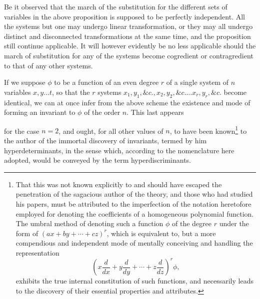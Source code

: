 \documentclass[11pt]{article}
\newcommand{\sourcepage}[1]{\marginpar{\scriptsize p.~#1}}
\begin{document}
Be it observed that the march of the substitution for the different sets of variables in the above proposition is supposed to be perfectly independent. All the systems but one may undergo linear transformation, or they may all undergo distinct and disconnected transformations at the same time, and the proposition still continue applicable. It will however evidently be no less applicable should the march of substitution for any of the systems become cogredient or contragredient to that of any other systems.

If we suppose $\phi$ to be a function of an even degree $r$ of a single system of $n$ variables $x,y\ldots t$, so that the $r$ systems $x_1,y_1,\&c., x_2,y_2,\&c.\ldots x_r,y_r,\&c.$ become identical, we can at once infer from the above scheme the existence and mode of forming an invariant to $\phi$ of the order $n$. This last appears

\sourcepage{308}
for the case $n=2$, and ought, for all other values of $n$, to have been known\footnote{That this was not known explicitly to and should have escaped the penetration of the sagacious author of the theory, and those who had studied his papers, must be attributed to the imperfection of the notation heretofore employed for denoting the coefficients of a homogeneous polynomial function. The umbral method of denoting such a function $\phi$ of the degree $r$ under the form of $(ax+by+\cdots+cz)^r$, which is equivalent to, but a more compendious and independent mode of mentally conceiving and handling the representation
\[
\left(x\frac{d}{dx}+y\frac{d}{dy}+\cdots+z\frac{d}{dz}\right)^r\phi,
\]
exhibits the true internal constitution of such functions, and necessarily leads to the discovery of their essential properties and attributes.} to the author of the immortal discovery of invariants, termed by him hyperdeterminants, in the sense which, according to the nomenclature here adopted, would be conveyed by the term hyperdiscriminants.
\end{document}
